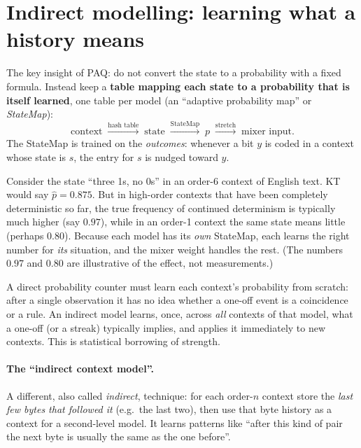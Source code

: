 \documentclass[11pt,a4paper,openany]{book}
\theoremstyle{definition}
\theoremstyle{remark}
\begin{document}
\section{Indirect modelling: learning what a history means}
\label{sec:indirect}

The key insight of PAQ: do not convert the state to a probability with a fixed formula. Instead keep a \textbf{table mapping each state to a probability that is itself learned}, one table per model (an ``adaptive probability map'' or \emph{StateMap}):
\[
\text{context}\;\xrightarrow{\text{hash table}}\;\text{state}\;\xrightarrow{\text{StateMap}}\;p\;\xrightarrow{\text{stretch}}\;\text{mixer input}.
\]
The StateMap is trained on the \emph{outcomes}: whenever a bit $y$ is coded in a context whose state is $s$, the entry for $s$ is nudged toward $y$.

\begin{example}
Consider the state ``three 1s, no 0s'' in an order-6 context of English text. KT would say $\hat p=0.875$. But in high-order contexts that have been completely deterministic so far, the true frequency of continued determinism is typically much higher (say $0.97$), while in an order-1 context the same state means little (perhaps $0.80$). Because each model has its \emph{own} StateMap, each learns the right number for \emph{its} situation, and the mixer weight handles the rest. (The numbers $0.97$ and $0.80$ are illustrative of the effect, not measurements.)
\end{example}

\begin{keyidea}
A direct probability counter must learn each context's probability from scratch: after a single observation it has no idea whether a one-off event is a coincidence or a rule. An indirect model learns, once, across \emph{all} contexts of that model, what a one-off (or a streak) typically implies, and applies it immediately to new contexts. This is statistical borrowing of strength.
\end{keyidea}

\paragraph{The ``indirect context model''.} A different, also called \emph{indirect}, technique: for each order-$n$ context store the \emph{last few bytes that followed it} (e.g.\ the last two), then use that byte history as a context for a second-level model. It learns patterns like ``after this kind of pair the next byte is usually the same as the one before''.
\end{document}
